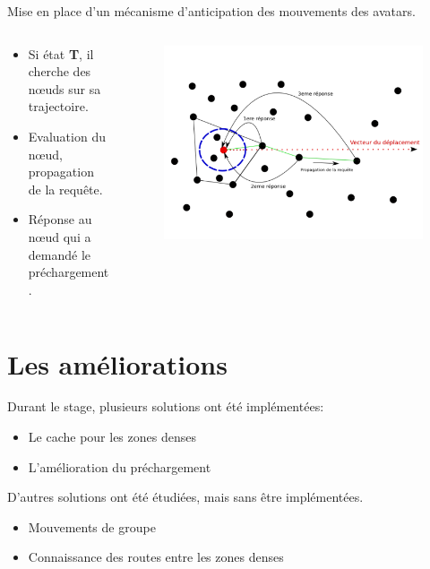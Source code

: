 \documentclass{beamer}
\begin{document}
  \begin{frame}
	Mise en place d'un mécanisme d'anticipation des mouvements des avatars.
	\begin{columns}
	  \begin{column}{5cm}
		\begin{itemize}
		  \item Si état \textbf{T}, il cherche des nœuds sur sa trajectoire.
		  \item Evaluation du nœud, propagation de la requête.
		  \item Réponse au nœud qui a demandé le préchargement.
		\end{itemize}
	  \end{column}
	\begin{column}{5cm}
	\begin{figure}
        \includegraphics[scale=0.1]{./Ressources/Images/propagation_algo.png}\\
        \label{Propa_Algo}
        \end{figure}
	\end{column}
	\end{columns}
  \end{frame}

  \section{Les améliorations}
  \begin{frame}
	Durant le stage, plusieurs solutions ont été implémentées:
	\begin{itemize}
		\pause\item Le cache pour les zones denses
		\pause\item L'amélioration du préchargement
	\end{itemize}
	\pause D'autres solutions ont été étudiées, mais sans être implémentées.
	\begin{itemize}
		\item Mouvements de groupe
		\item Connaissance des routes entre les zones denses
	\end{itemize}
  \end{frame}
\end{document}
